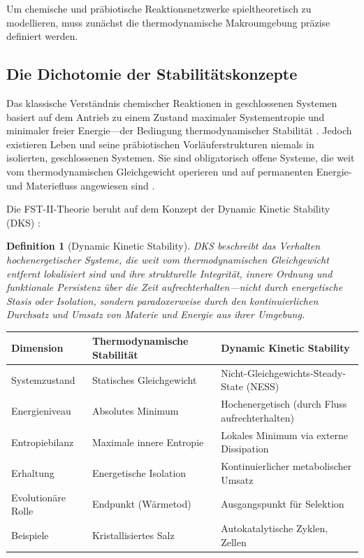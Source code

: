 \documentclass[12pt,a4paper]{article}
\newtheorem{definition}{Definition}
\theoremstyle{remark}
\begin{document}
Um chemische und pr\"abiotische Reaktionsnetzwerke spieltheoretisch zu modellieren, muss zun\"achst die thermodynamische Makroumgebung pr\"azise definiert werden.

\subsection{Die Dichotomie der Stabilit\"atskonzepte}

Das klassische Verst\"andnis chemischer Reaktionen in geschlossenen Systemen basiert auf dem Antrieb zu einem Zustand maximaler Systementropie und minimaler freier Energie---der Bedingung thermodynamischer Stabilit\"at \citep{StrategicPersistence}. Jedoch existieren Leben und seine pr\"abiotischen Vorl\"auferstrukturen niemals in isolierten, geschlossenen Systemen. Sie sind obligatorisch offene Systeme, die weit vom thermodynamischen Gleichgewicht operieren und auf permanenten Energie- und Materiefluss angewiesen sind \citep{Bioenergetics}.

Die FST-II-Theorie beruht auf dem Konzept der Dynamic Kinetic Stability (DKS) \citep{StrategicPersistence}:

\begin{definition}[Dynamic Kinetic Stability]
DKS beschreibt das Verhalten hochenergetischer Systeme, die weit vom thermodynamischen Gleichgewicht entfernt lokalisiert sind und ihre strukturelle Integrit\"at, innere Ordnung und funktionale Persistenz \"uber die Zeit aufrechterhalten---nicht durch energetische Stasis oder Isolation, sondern paradoxerweise durch den kontinuierlichen Durchsatz und Umsatz von Materie und Energie aus ihrer Umgebung.
\end{definition}

\begin{center}
\begin{tabular}{lll}
\toprule
\textbf{Dimension} & \textbf{Thermodynamische Stabilit\"at} & \textbf{Dynamic Kinetic Stability} \\
\midrule
Systemzustand & Statisches Gleichgewicht & Nicht-Gleichgewichts-Steady-State (NESS) \\
Energieniveau & Absolutes Minimum & Hochenergetisch (durch Fluss aufrechterhalten) \\
Entropiebilanz & Maximale innere Entropie & Lokales Minimum via externe Dissipation \\
Erhaltung & Energetische Isolation & Kontinuierlicher metabolischer Umsatz \\
Evolution\"are Rolle & Endpunkt (W\"armetod) & Ausgangspunkt f\"ur Selektion \\
Beispiele & Kristallisiertes Salz & Autokatalytische Zyklen, Zellen \\
\bottomrule
\end{tabular}
\end{center}
\end{document}
